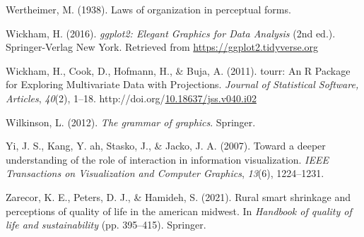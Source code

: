 \documentclass[print]{nuthesis}
\newlength{\cslhangindent}
\newenvironment{CSLReferences}[2]%
{\setlength{\parindent}{0pt}%
\everypar{\setlength{\hangindent}{\cslhangindent}}\ignorespaces}%
{\par}
\begin{document}
\begin{CSLReferences}{1}{0}
\leavevmode{}%
Wertheimer, M. (1938). Laws of organization in perceptual forms.

\leavevmode{}%
Wickham, H. (2016). \emph{{ggplot2: Elegant Graphics for Data Analysis}} (2nd ed.). Springer-Verlag New York. Retrieved from \url{https://ggplot2.tidyverse.org}

\leavevmode{}%
Wickham, H., Cook, D., Hofmann, H., \& Buja, A. (2011). {tourr: An R Package for Exploring Multivariate Data with Projections}. \emph{Journal of Statistical Software, Articles}, \emph{40}(2), 1--18. http://doi.org/\href{https://doi.org/10.18637/jss.v040.i02}{10.18637/jss.v040.i02}

\leavevmode{}%
Wilkinson, L. (2012). \emph{The grammar of graphics}. Springer.

\leavevmode{}%
Yi, J. S., Kang, Y. ah, Stasko, J., \& Jacko, J. A. (2007). Toward a deeper understanding of the role of interaction in information visualization. \emph{IEEE Transactions on Visualization and Computer Graphics}, \emph{13}(6), 1224--1231.

\leavevmode{}%
Zarecor, K. E., Peters, D. J., \& Hamideh, S. (2021). Rural smart shrinkage and perceptions of quality of life in the american midwest. In \emph{Handbook of quality of life and sustainability} (pp. 395--415). Springer.

\end{CSLReferences}


\backmatter

% 






\end{document}
